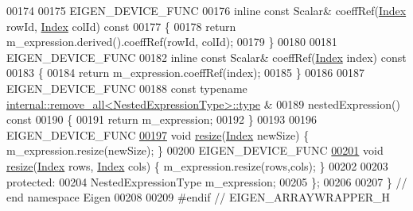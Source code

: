 \begin{DoxyCode}
00174 
00175     EIGEN\_DEVICE\_FUNC
00176     \textcolor{keyword}{inline} \textcolor{keyword}{const} Scalar& coeffRef(\hyperlink{namespace_eigen_a62e77e0933482dafde8fe197d9a2cfde}{Index} rowId, \hyperlink{namespace_eigen_a62e77e0933482dafde8fe197d9a2cfde}{Index} colId)\textcolor{keyword}{ const}
00177 \textcolor{keyword}{    }\{
00178       \textcolor{keywordflow}{return} m\_expression.derived().coeffRef(rowId, colId);
00179     \}
00180 
00181     EIGEN\_DEVICE\_FUNC
00182     \textcolor{keyword}{inline} \textcolor{keyword}{const} Scalar& coeffRef(\hyperlink{namespace_eigen_a62e77e0933482dafde8fe197d9a2cfde}{Index} index)\textcolor{keyword}{ const}
00183 \textcolor{keyword}{    }\{
00184       \textcolor{keywordflow}{return} m\_expression.coeffRef(index);
00185     \}
00186 
00187     EIGEN\_DEVICE\_FUNC
00188     \textcolor{keyword}{const} \textcolor{keyword}{typename} \hyperlink{group___sparse_core___module}{internal::remove\_all<NestedExpressionType>::type}
      & 
00189     nestedExpression()\textcolor{keyword}{ const }
00190 \textcolor{keyword}{    }\{
00191       \textcolor{keywordflow}{return} m\_expression;
00192     \}
00193 
00196     EIGEN\_DEVICE\_FUNC
\hyperlink{group___core___module_a0244fd1071715e2b0cd60e39c1e6e56a}{00197}     \textcolor{keywordtype}{void} \hyperlink{group___core___module_a0244fd1071715e2b0cd60e39c1e6e56a}{resize}(\hyperlink{namespace_eigen_a62e77e0933482dafde8fe197d9a2cfde}{Index} newSize) \{ m\_expression.resize(newSize); \}
00200     EIGEN\_DEVICE\_FUNC
\hyperlink{group___core___module_a6b0c3c352ad14c57294b022237b7489f}{00201}     \textcolor{keywordtype}{void} \hyperlink{group___core___module_a6b0c3c352ad14c57294b022237b7489f}{resize}(\hyperlink{namespace_eigen_a62e77e0933482dafde8fe197d9a2cfde}{Index} rows, \hyperlink{namespace_eigen_a62e77e0933482dafde8fe197d9a2cfde}{Index} cols) \{ m\_expression.resize(rows,cols); \}
00202 
00203   \textcolor{keyword}{protected}:
00204     NestedExpressionType m\_expression;
00205 \};
00206 
00207 \} \textcolor{comment}{// end namespace Eigen}
00208 
00209 \textcolor{preprocessor}{#endif // EIGEN\_ARRAYWRAPPER\_H}
\end{DoxyCode}
